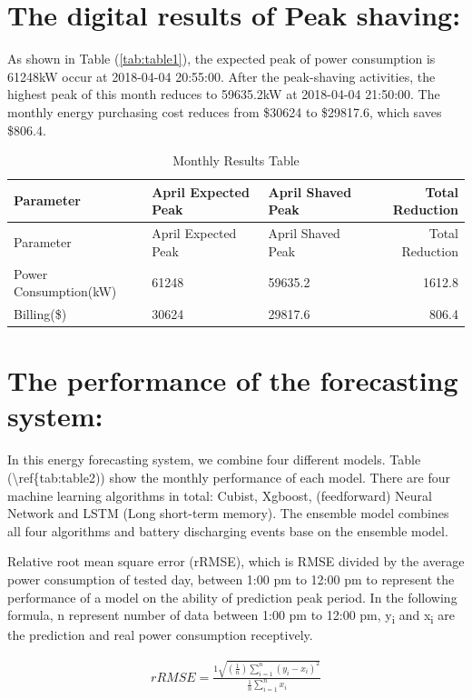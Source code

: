 \documentclass[
]{article}
\begin{document}
\hypertarget{the-digital-results-of-peak-shaving}{%
\section{The digital results of Peak
shaving:}\label{the-digital-results-of-peak-shaving}}

As shown in Table (\ref{tab:table1}), the expected peak of power
consumption is {61248}kW occur at {2018-04-04 20:55:00}. After the
peak-shaving activities, the highest peak of this month reduces to {
59635.2}kW at { 2018-04-04 21:50:00}. The monthly energy purchasing cost
reduces from \${30624} to \${29817.6}, which saves \${806.4}.

\begin{longtable}[]{@{}lllr@{}}
\caption{Monthly Results Table}\tabularnewline
\toprule
Parameter & April Expected Peak & April Shaved Peak & Total
Reduction\tabularnewline
\midrule
\endfirsthead
\toprule
Parameter & April Expected Peak & April Shaved Peak & Total
Reduction\tabularnewline
\midrule
\endhead
Power Consumption(kW) & 61248 & 59635.2 & 1612.8\tabularnewline
Billing(\$) & 30624 & 29817.6 & 806.4\tabularnewline
\bottomrule
\end{longtable}

\hypertarget{the-performance-of-the-forecasting-system}{%
\section{The performance of the forecasting
system:}\label{the-performance-of-the-forecasting-system}}

In this energy forecasting system, we combine four different models.
Table (\textbackslash{}ref\{tab:table2)) show the monthly performance of
each model. There are four machine learning algorithms in total: Cubist,
Xgboost, (feedforward) Neural Network and LSTM (Long short-term memory).
The ensemble model combines all four algorithms and battery discharging
events base on the ensemble model.

Relative root mean square error (rRMSE), which is RMSE divided by the
average power consumption of tested day, between 1:00 pm to 12:00 pm to
represent the performance of a model on the ability of prediction peak
period. In the following formula, n represent number of data between
1:00 pm to 12:00 pm, y\textsubscript{i} and x\textsubscript{i} are the
prediction and real power consumption receptively.

\begin{align}
rRMSE = \frac{1\sqrt{(\frac{1}{n})\sum_{i=1}^{n}(y_{i} - x_{i})^{2}}}{\frac{1}{n}\sum_{i=1}^{n}x_{i}}
\end{align}
\end{document}
